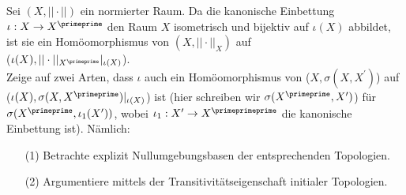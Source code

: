 \begin{exercise}
Sei $(X,||\cdot||)$ ein normierter Raum. Da die kanonische Einbettung $\iota: X
\rightarrow X^{\primeprime}$ den Raum $X$ isometrisch und bijektiv auf $\iota(X)$
abbildet, ist sie ein Homöomorphismus von $(X,||\cdot||_X)$ auf \\
($\iota(X),||\cdot||_{X^{\primeprime}}|_{\iota(X)}$). \\
Zeige auf zwei Arten, dass $\iota$ auch ein Homöomorphismus von ($X,\sigma(X,X^{\prime})$)
auf ($\iota(X),\sigma(X,X^{\primeprime})|_{\iota(X)}$) ist (hier schreiben wir
$\sigma(X^{\primeprime},X^{\prime})$) für $\sigma(X^{\primeprime},\iota_1(X^{\prime}))$,
wobei $\iota_1: X^{\prime} \rightarrow X^{\primeprimeprime}$ die kanonische Einbettung ist).
Nämlich:
\begin{itemize}
  \item [(1)] Betrachte explizit Nullumgebungsbasen der entsprechenden Topologien.
  \item [(2)] Argumentiere mittels der Transitivitätseigenschaft initialer Topologien.
\end{itemize}
\end{exercise}

